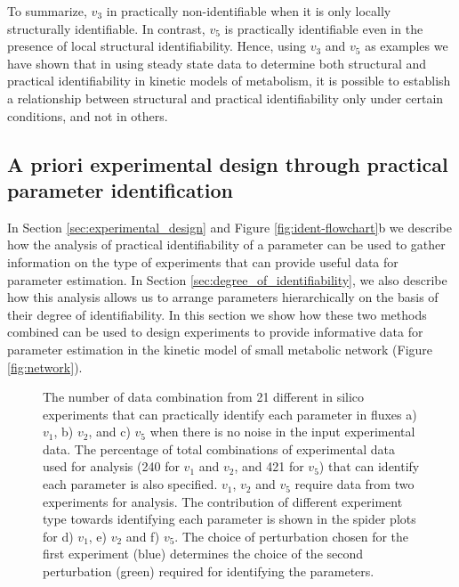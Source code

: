 \documentclass[10pt]{article}
\begin{document}
	 To summarize, $v_3$ in practically non-identifiable when it is only locally structurally identifiable. In contrast, $v_5$ is practically identifiable even in the presence of local structural identifiability. Hence, using $v_3$ and $v_5$ as examples we have shown that in using steady state data to determine both structural and practical identifiability in kinetic models of metabolism, it is possible to establish a relationship between structural and practical identifiability only under certain conditions, and not in others.	 
	
	\subsection{A priori experimental design through practical parameter identification}\label{sec:design}	
	In Section \ref{sec:experimental_design} and Figure \ref{fig:ident-flowchart}b we describe how the analysis of practical identifiability of a parameter can be used to gather information on the type of experiments that can provide useful data for parameter estimation. In Section \ref{sec:degree_of_identifiability}, we also describe how this analysis allows us to arrange parameters hierarchically on the basis of their degree of identifiability. In this section we show how these two methods combined can be used to design experiments to provide informative data for parameter estimation in the kinetic model of small metabolic network (Figure \ref{fig:network}).
	
	\begin{figure}[!tbhp]
		\caption{The number of data combination from 21 different in silico experiments that can practically identify each parameter in fluxes a) $v_1$, b) $v_2$, and c) $v_5$ when there is no noise in the input experimental data. The percentage of total combinations of experimental data used for analysis (240 for $v_1$ and $v_2$, and 421 for $v_5$) that can identify each parameter is also specified. $v_1$, $v_2$ and $v_5$ require data from two experiments for analysis. The contribution of different experiment type towards identifying each parameter is shown in the spider plots for d) $v_1$, e) $v_2$ and f) $v_5$. The choice of perturbation chosen for the first experiment (blue) determines the choice of the second perturbation (green) required for identifying the parameters.}\label{fig:ident}
	\end{figure}
	
\end{document}
